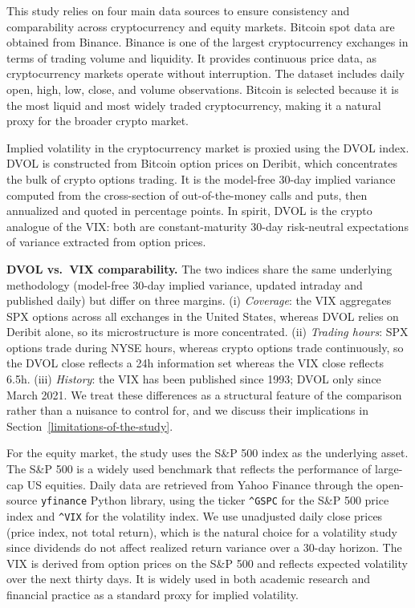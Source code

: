 \documentclass[11pt,a4paper,openany]{report}
\begin{document}
This study relies on four main data sources to ensure consistency and
comparability across cryptocurrency and equity markets. Bitcoin spot
data are obtained from Binance. Binance is one of the largest
cryptocurrency exchanges in terms of trading volume and liquidity. It
provides continuous price data, as cryptocurrency markets operate
without interruption. The dataset includes daily open, high, low, close,
and volume observations. Bitcoin is selected because it is the most
liquid and most widely traded cryptocurrency, making it a natural proxy
for the broader crypto market.

Implied volatility in the cryptocurrency market is proxied using the
DVOL index. DVOL is constructed from Bitcoin option prices on Deribit,
which concentrates the bulk of crypto options trading. It is the
model-free 30-day implied variance computed from the cross-section of
out-of-the-money calls and puts, then annualized and quoted in
percentage points. In spirit, DVOL is the crypto analogue of the VIX:
both are constant-maturity 30-day risk-neutral expectations of variance
extracted from option prices.

\textbf{DVOL vs.\ VIX comparability.} The two indices share the same
underlying methodology (model-free 30-day implied variance, updated
intraday and published daily) but differ on three margins. (i)
\emph{Coverage}: the VIX aggregates SPX options across all exchanges in
the United States, whereas DVOL relies on Deribit alone, so its
microstructure is more concentrated. (ii) \emph{Trading hours}: SPX
options trade during NYSE hours, whereas crypto options trade
continuously, so the DVOL close reflects a 24h information set whereas
the VIX close reflects 6.5h. (iii) \emph{History}: the VIX has been
published since 1993; DVOL only since March 2021. We treat these
differences as a structural feature of the comparison rather than a
nuisance to control for, and we discuss their implications in
Section~\ref{limitations-of-the-study}.

For the equity market, the study uses the S\&P 500 index as the
underlying asset. The S\&P 500 is a widely used benchmark that reflects
the performance of large-cap US equities. Daily data are retrieved from
Yahoo Finance through the open-source \texttt{yfinance} Python library,
using the ticker \texttt{\^{}GSPC} for the S\&P 500 price index and
\texttt{\^{}VIX} for the volatility index. We use unadjusted daily close
prices (price index, not total return), which is the natural choice for
a volatility study since dividends do not affect realized return
variance over a 30-day horizon. The VIX is derived from option prices on
the S\&P 500 and reflects expected volatility over the next thirty days.
It is widely used in both academic research and financial practice as a
standard proxy for implied volatility.
\end{document}
